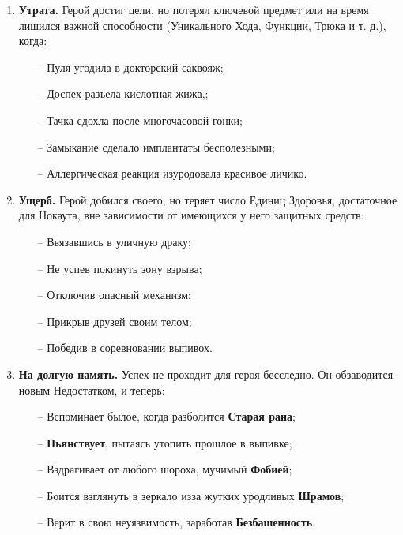 \begin{enumerate}
\item \textbf{Утрата.} Герой достиг цели, но потерял ключевой предмет или на время лишился важной способности (Уникального Хода, Функции, Трюка и т. д.), когда:
\begin{itemize}
    \item[--] Пуля угодила в докторский саквояж;
    \item[--] Доспех разъела кислотная жижа,;
    \item[--] Тачка сдохла после многочасовой гонки;
    \item[--] Замыкание сделало имплантаты бесполезными;
    \item[--] Аллергическая реакция изуродовала красивое личико.
\end{itemize}

\item \textbf{Ущерб.} Герой добился своего, но теряет число Единиц Здоровья, достаточное для Нокаута, вне зависимости от имеющихся у него защитных средств:
\begin{itemize}
    \item[--] Ввязавшись в уличную драку;
    \item[--] Не успев покинуть зону взрыва;
    \item[--] Отключив опасный механизм;
    \item[--] Прикрыв друзей своим телом;
    \item[--] Победив в соревновании выпивох.
\end{itemize}

\item \textbf{На долгую память.} Успех не проходит для героя бесследно. Он обзаводится новым Недостатком, и теперь:
\begin{itemize}
    \item[--] Вспоминает былое, когда разболится \textbf{Старая рана};
    \item[--] \textbf{Пьянствует}, пытаясь утопить прошлое в выпивке;
    \item[--] Вздрагивает от любого шороха, мучимый \textbf{Фобией};
    \item[--] Боится взглянуть в зеркало изза жутких уродливых \textbf{Шрамов};
    \item[--] Верит в свою неуязвимость, заработав \textbf{Безбашенность}.
\end{itemize}

\end{enumerate}

